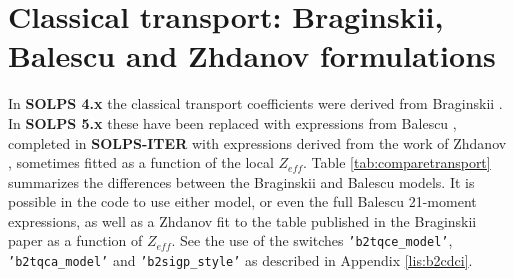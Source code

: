 \documentclass[a4paper,10pt]{report}
\newcommand\SOLPSfour{{\bf SOLPS 4.x} }
\newcommand\SOLPSfive{{\bf SOLPS 5.x} }
\newcommand\SOLPSITER{{\bf SOLPS-ITER} }
\begin{document}
\section{Classical transport: Braginskii, Balescu and Zhdanov formulations}
\label{sec:balescubraginskii}

In \SOLPSfour the classical transport coefficients were derived from Braginskii \cite{Braginskii65}.
In \SOLPSfive these have been replaced with expressions from Balescu \cite{BALESCUA98A}, completed in \SOLPSITER with expressions derived from the work of Zhdanov \cite{ZHDANOV2002}, sometimes fitted
as a function of the local $Z_{eff}$.
Table \ref{tab:comparetransport} summarizes the differences between the Braginskii and Balescu models.
It is possible in the code to use either model, or even the full Balescu 21-moment expressions, as well as
a Zhdanov fit to the table published in the Braginskii paper as a function of $Z_{eff}$.
See the use of the switches {\tt 'b2tqce\_model'}, {\tt 'b2tqca\_model'} and {\tt 'b2sigp\_style'} as described in Appendix \ref{lis:b2cdci}.
\end{document}
